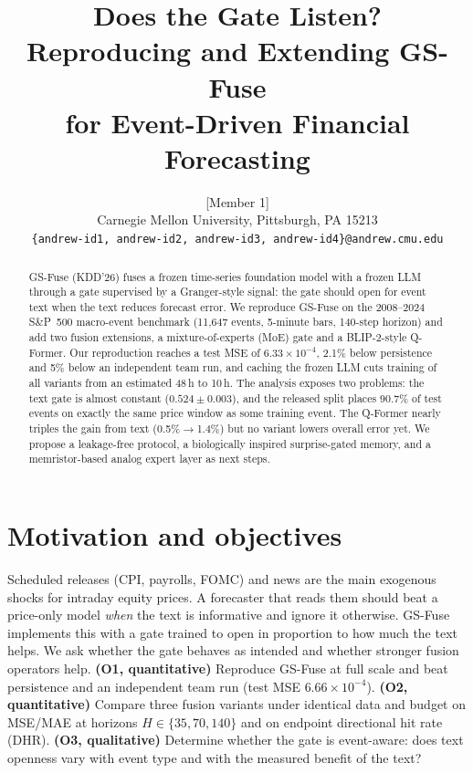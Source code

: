 \documentclass{article}
\title{Does the Gate Listen? Reproducing and Extending GS-Fuse\\ for Event-Driven Financial Forecasting}
\author{%
  [Member 1] \And [Member 2] \And [Member 3] \And [Member 4] \\
  Carnegie Mellon University, Pittsburgh, PA 15213 \\
  \texttt{\{andrew-id1, andrew-id2, andrew-id3, andrew-id4\}@andrew.cmu.edu}
}
\begin{document}
\maketitle

\begin{abstract}
GS-Fuse (KDD'26) fuses a frozen time-series foundation model with a frozen LLM through a gate supervised by a Granger-style signal: the gate should open for event text when the text reduces forecast error.
We reproduce GS-Fuse on the 2008--2024 S\&P~500 macro-event benchmark (11{,}647 events, 5-minute bars, 140-step horizon) and add two fusion extensions, a mixture-of-experts (MoE) gate and a BLIP-2-style Q-Former.
Our reproduction reaches a test MSE of $6.33\times10^{-4}$, 2.1\% below persistence and 5\% below an independent team run, and caching the frozen LLM cuts training of all variants from an estimated 48\,h to 10\,h.
The analysis exposes two problems: the text gate is almost constant ($0.524\pm0.003$), and the released split places 90.7\% of test events on exactly the same price window as some training event.
The Q-Former nearly triples the gain from text (0.5\%$\to$1.4\%) but no variant lowers overall error yet.
We propose a leakage-free protocol, a biologically inspired surprise-gated memory, and a memristor-based analog expert layer as next steps.
\end{abstract}

\section{Motivation and objectives}
Scheduled releases (CPI, payrolls, FOMC) and news are the main exogenous shocks for intraday equity prices. A forecaster that reads them should beat a price-only model \emph{when} the text is informative and ignore it otherwise. GS-Fuse~\cite{gsfuse} implements this with a gate trained to open in proportion to how much the text helps. We ask whether the gate behaves as intended and whether stronger fusion operators help.
\textbf{(O1, quantitative)} Reproduce GS-Fuse at full scale and beat persistence and an independent team run (test MSE $6.66\times10^{-4}$).
\textbf{(O2, quantitative)} Compare three fusion variants under identical data and budget on MSE/MAE at horizons $H\in\{35,70,140\}$ and on endpoint directional hit rate (DHR).
\textbf{(O3, qualitative)} Determine whether the gate is event-aware: does text openness vary with event type and with the measured benefit of the text?
\end{document}
